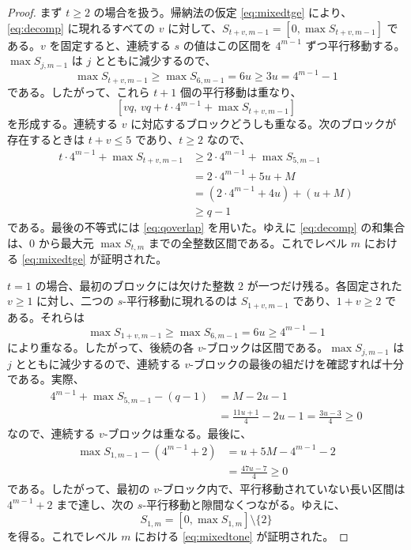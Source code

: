 \documentclass[12pt]{ltjsarticle}
\theoremstyle{plain}
\theoremstyle{definition}
\theoremstyle{plain}
\begin{document}
\begin{proof}
まず $t\geq2$ の場合を扱う。帰納法の仮定 \eqref{eq:mixedtge} により、\eqref{eq:decomp} に現れるすべての $v$ に対して、$S_{t+v,m-1}=[0,\max S_{t+v,m-1}]$ である。$v$ を固定すると、連続する $s$ の値はこの区間を $4^{m-1}$ ずつ平行移動する。$\max S_{j,m-1}$ は $j$ とともに減少するので、
\[
 \max S_{t+v,m-1}\geq\max S_{6,m-1}=6u
     \geq3u=4^{m-1}-1
\]
である。したがって、これら $t+1$ 個の平行移動は重なり、
\[
 [vq,\,vq+t\cdot4^{m-1}+\max S_{t+v,m-1}]
\]
を形成する。連続する $v$ に対応するブロックどうしも重なる。次のブロックが存在するときは $t+v\leq5$ であり、$t\geq2$ なので、
\[
\begin{aligned}
 t\cdot4^{m-1}+\max S_{t+v,m-1}
 &\geq2\cdot4^{m-1}+\max S_{5,m-1}\\
 &=2\cdot4^{m-1}+5u+M\\
 &=(2\cdot4^{m-1}+4u)+(u+M)\\
 &\geq q-1
\end{aligned}
\]
である。最後の不等式には \eqref{eq:qoverlap} を用いた。ゆえに \eqref{eq:decomp} の和集合は、$0$ から最大元 $\max S_{t,m}$ までの全整数区間である。これでレベル $m$ における \eqref{eq:mixedtge} が証明された。

$t=1$ の場合、最初のブロックには欠けた整数 $2$ が一つだけ残る。各固定された $v\geq1$ に対し、二つの $s$-平行移動に現れるのは $S_{1+v,m-1}$ であり、$1+v\geq2$ である。それらは
\[
 \max S_{1+v,m-1}\geq\max S_{6,m-1}=6u\geq4^{m-1}-1
\]
により重なる。したがって、後続の各 $v$-ブロックは区間である。$\max S_{j,m-1}$ は $j$ とともに減少するので、連続する $v$-ブロックの最後の組だけを確認すれば十分である。実際、
\[
\begin{aligned}
 4^{m-1}+\max S_{5,m-1}-(q-1)
 &=M-2u-1\\
 &=\frac{11u+1}{4}-2u-1
  =\frac{3u-3}{4}\geq0
\end{aligned}
\]
なので、連続する $v$-ブロックは重なる。最後に、
\[
\begin{aligned}
 \max S_{1,m-1}-(4^{m-1}+2)
 &=u+5M-4^{m-1}-2\\
 &=\frac{47u-7}{4}\geq0
\end{aligned}
\]
である。したがって、最初の $v$-ブロック内で、平行移動されていない長い区間は $4^{m-1}+2$ まで達し、次の $s$-平行移動と隙間なくつながる。ゆえに、
\[
 S_{1,m}=[0,\max S_{1,m}]\setminus\{2\}
\]
を得る。これでレベル $m$ における \eqref{eq:mixedtone} が証明された。


\end{proof}
\end{document}
